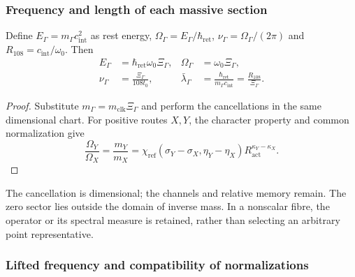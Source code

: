 \subsubsection{Frequency and length of each massive section}
\label{md:hib:frecuencia-longitud}

Define $E_\Gamma=m_\Gamma c_{\mathrm{int}}^2$ as rest energy,
$\Omega_\Gamma=E_\Gamma/\hbar_{\mathrm{ret}}$,
$\nu_\Gamma=\Omega_\Gamma/(2\pi)$ and
$R_{108}=c_{\mathrm{int}}/\omega_0$. Then
\begin{equation}
 \begin{aligned}
 E_\Gamma&=\hbar_{\mathrm{ret}}\omega_0\Xi_\Gamma,&
 \Omega_\Gamma&=\omega_0\Xi_\Gamma,\\
 \nu_\Gamma&=\frac{\Xi_\Gamma}{108t_0},&
 \bar\lambda_\Gamma&=
 \frac{\hbar_{\mathrm{ret}}}{m_\Gamma c_{\mathrm{int}}}
 =\frac{R_{108}}{\Xi_\Gamma}.
 \end{aligned}
 \label{md:hib:frecuencias}
\end{equation}
\begin{proof}
Substitute $m_\Gamma=m_{\mathrm{clk}}\Xi_\Gamma$ and perform the
cancellations in the same dimensional chart. For positive routes $X,Y$,
the character property and common normalization give
\begin{equation}
 \frac{\Omega_Y}{\Omega_X}=\frac{m_Y}{m_X}
 =\chi_{\mathrm{ref}}(\sigma_Y-\sigma_X,\eta_Y-\eta_X)
 R_{\mathrm{act}}^{\kappa_Y-\kappa_X}.
 \label{md:hib:cocientes}
\end{equation}
\end{proof}
The cancellation is dimensional; the channels and relative memory remain.
The zero sector lies outside the domain of inverse mass.
In a nonscalar fibre, the operator or its spectral measure is retained,
rather than selecting an arbitrary point representative.

\subsubsection{Lifted frequency and compatibility of normalizations}
\label{md:hib:tres-frecuencias}

